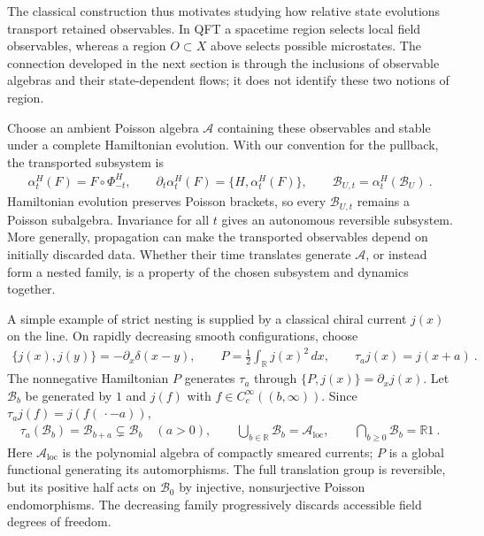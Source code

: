 \documentclass[a4paper,11pt]{article}
\theoremstyle{definition}
\begin{document}
The classical construction thus motivates studying how relative state evolutions transport retained observables. In QFT a spacetime region selects local field observables, whereas a region $O\subset X$ above selects possible microstates. The connection developed in the next section is through the inclusions of observable algebras and their state-dependent flows; it does not identify these two notions of region.


Choose an ambient Poisson algebra $\mathcal A$ containing these observables and stable under a complete Hamiltonian evolution. With our convention for the pullback, the transported subsystem is
\begin{align}
    \alpha_t^H(F)=F\circ\Phi_{-t}^H,
    \qquad \partial_t\alpha_t^H(F)=\{H,\alpha_t^H(F)\},
    \qquad \mathcal B_{U,t}=\alpha_t^H(\mathcal B_U)\ .
\end{align}
Hamiltonian evolution preserves Poisson brackets, so every $\mathcal B_{U,t}$ remains a Poisson subalgebra. Invariance for all $t$ gives an autonomous reversible subsystem. More generally, propagation can make the transported observables depend on initially discarded data. Whether their time translates generate $\mathcal A$, or instead form a nested family, is a property of the chosen subsystem and dynamics together.

A simple example of strict nesting is supplied by a classical chiral current $j(x)$ on the line. On rapidly decreasing smooth configurations, choose
\begin{align}
    \{j(x),j(y)\}=-\partial_x\delta(x-y),
    \qquad P=\frac12\int_{\mathbb R}j(x)^2\,dx,
    \qquad \tau_a j(x)=j(x+a)\ .
\end{align}
The nonnegative Hamiltonian $P$ generates $\tau_a$ through $\{P,j(x)\}=\partial_xj(x)$. Let $\mathcal B_b$ be generated by $1$ and $j(f)$ with $f\in C_c^\infty((b,\infty))$. Since $\tau_a j(f)=j(f(\,\cdot-a))$,
\begin{align}
    \tau_a(\mathcal B_b)=\mathcal B_{b+a}\subsetneq\mathcal B_b\quad(a>0),
    \qquad
    \bigcup_{b\in\mathbb R}\mathcal B_b=\mathcal A_{\mathrm{loc}},
    \qquad
    \bigcap_{b\geq0}\mathcal B_b=\mathbb R1\ .
\end{align}
Here $\mathcal A_{\mathrm{loc}}$ is the polynomial algebra of compactly smeared currents; $P$ is a global functional generating its automorphisms. The full translation group is reversible, but its positive half acts on $\mathcal B_0$ by injective, nonsurjective Poisson endomorphisms. The decreasing family progressively discards accessible field degrees of freedom.
\end{document}
